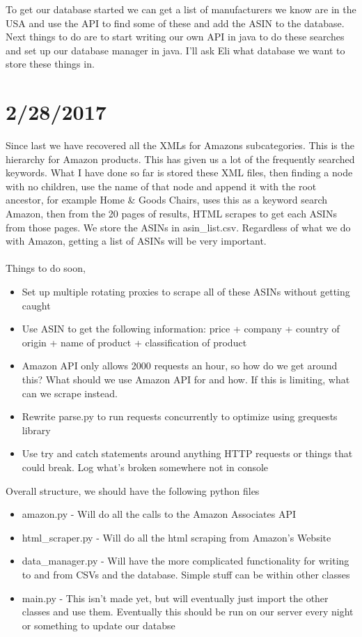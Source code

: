 \documentclass[12pt]{article}
\begin{document}
To get our database started we can get a list of manufacturers we know are in the USA and use the API to find some of these and add the ASIN to the database. Next things to do are to start writing our own API in java to do these searches and set up our database manager in java. I'll ask Eli what database we want to store these things in.

\section*{2/28/2017}
Since last we have recovered all the XMLs for Amazons subcategories. This is the hierarchy for Amazon products. This has given us a lot of the frequently searched keywords. What I have done so far is stored these XML files, then finding a node with no children, use the name of that node and append it with the root ancestor, for example Home \& Goods Chairs, uses this as a keyword search Amazon, then from the 20 pages of results, HTML scrapes to get each ASINs from those pages. We store the ASINs in asin_list.csv. Regardless of what we do with Amazon, getting a list of ASINs will be very important. \\ \\
Things to do soon,

\begin{itemize}
	\item Set up multiple rotating proxies to scrape all of these ASINs without getting caught
	\item Use ASIN to get the following information: price + company + country of origin + name of product + classification of product
	\item Amazon API only allows 2000 requests an hour, so how do we get around this? What should we use Amazon API for and how. If this is limiting, what can we scrape instead.
	\item Rewrite parse.py to run requests concurrently to optimize using grequests library
	\item Use try and catch statements around anything HTTP requests or things that could break. Log what's broken somewhere not in console
\end{itemize}

Overall structure, we should have the following python files

\begin{itemize}
	\item amazon.py - Will do all the calls to the Amazon Associates API
	\item html_scraper.py - Will do all the html scraping from Amazon's Website 
	\item data_manager.py - Will have the more complicated functionality for writing to and from CSVs and the database. Simple stuff can be within other classes
	\item main.py - This isn't made yet, but will eventually just import the other classes and use them. Eventually this should be run on our server every night or something to update our databse
\end{itemize}
\end{document}
